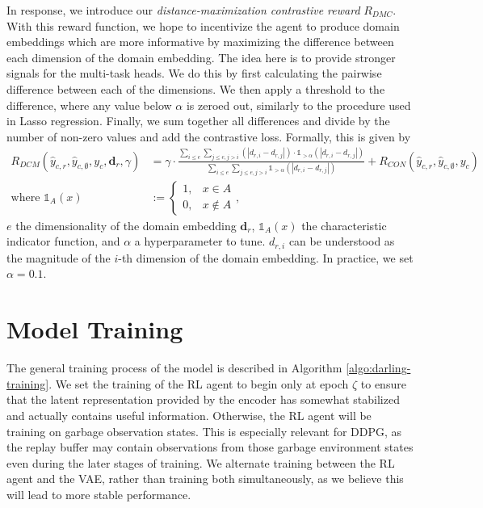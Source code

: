 In response, we introduce our \textit{distance-maximization contrastive reward} $R_{DMC}$.
With this reward function, we hope to incentivize the agent to produce domain embeddings which are more informative by maximizing the difference between each dimension of the domain embedding.
The idea here is to provide stronger signals for the multi-task heads.
We do this by first calculating the pairwise difference between each of the dimensions.
We then apply a threshold to the difference, where any value below $\alpha$ is zeroed out, similarly to the procedure used in Lasso regression.
Finally, we sum together all differences and divide by the number of non-zero values and add the contrastive loss.
Formally, this is given by
\begin{align}
	R_{DCM} (\hat{y}_{c,r}, \hat{y}_{c,\emptyset}, y_c, \boldsymbol{d}_r, \gamma) &= \gamma \cdot
		\frac{\sum_{i \leq e} \sum_{j \leq e, j > i} \left(|d_{r,i} - d_{r,j}|\right) \cdot \mathds{1}_{>\alpha}\left(|d_{r,i} - d_{r,j}|\right)}
		     {\sum_{i \leq e} \sum_{j \leq e, j > i} \mathds{1}_{>\alpha}\left(|d_{r,i} - d_{r,j}|\right)}
		+ R_{CON}(\hat{y}_{c,r}, \hat{y}_{c,\emptyset}, y_c) \\
	\text{where } \mathds{1}_A(x) &:= \begin{cases}
		1, & x \in A\\
		0, & x \notin A
	\end{cases},
\end{align}
$e$ the dimensionality of the domain embedding $\boldsymbol{d}_r$, $\mathds{1}_{A}(x)$ the characteristic indicator function, and $\alpha$ a hyperparameter to tune.
$d_{r,i}$ can be understood as the magnitude of the $i$-th dimension of the domain embedding.
In practice, we set $\alpha = 0.1$.

\section{Model Training}\label{sec:methodology-training}

The general training process of the model is described in Algorithm \ref{algo:darling-training}.
We set the training of the RL agent to begin only at epoch $\zeta$ to ensure that the latent representation provided by the encoder has somewhat stabilized and actually contains useful information.
Otherwise, the RL agent will be training on garbage observation states.
This is especially relevant for DDPG, as the replay buffer may contain observations from those garbage environment states even during the later stages of training.
We alternate training between the RL agent and the VAE, rather than training both simultaneously, as we believe this will lead to more stable performance.

